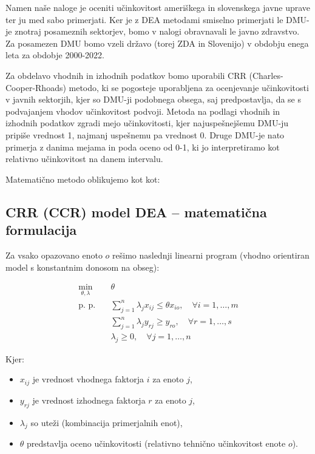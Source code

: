 \documentclass[12pt,a4paper]{article}
\theoremstyle{definition}
\begin{document}
Namen naše naloge je oceniti učinkovitost ameriškega in slovenskega
javne uprave ter ju med sabo primerjati. Ker je z DEA metodami smiselno
primerjati le DMU-je znotraj posameznih sektorjev, bomo v nalogi obravnavali le
javno zdravstvo. Za posamezen DMU bomo vzeli državo (torej ZDA in Slovenijo) v obdobju 
enega leta za obdobje 2000-2022. 

Za obdelavo vhodnih in izhodnih podatkov bomo uporabili CRR 
(Charles-Cooper-Rhoads) metodo, ki se pogosteje uporabljena za 
ocenjevanje učinkovitosti v javnih sektorjih, kjer so DMU-ji podobnega obsega, saj 
predpostavlja, da se s podvajanjem vhodov učinkovitost podvoji. 
Metoda na podlagi vhodnih in izhodnih podatkov zgradi mejo učinkovitosti, kjer najuspešnejšemu DMU-ju pripiše vrednost 1,
najmanj uspešnemu pa vrednost 0. Druge DMU-je nato primerja z danima mejama in poda oceno od 0-1, ki jo
interpretiramo kot relativno učinkovitost na danem intervalu.

Matematično metodo oblikujemo kot kot:

\subsection{CRR (CCR) model DEA – matematična formulacija}

Za vsako opazovano enoto \( o \) rešimo naslednji linearni program (vhodno orientiran model s konstantnim donosom na obseg):

\begin{align*}
\min_{\theta, \lambda} \quad & \theta \\
\text{p. p.} \quad 
& \sum_{j=1}^{n} \lambda_j x_{ij} \leq \theta x_{io}, \quad \forall i = 1, \dots, m \\
& \sum_{j=1}^{n} \lambda_j y_{rj} \geq y_{ro}, \quad \forall r = 1, \dots, s \\
& \lambda_j \geq 0, \quad \forall j = 1, \dots, n
\end{align*}

Kjer:
\begin{itemize}
    \item \( x_{ij} \) je vrednost vhodnega faktorja \( i \) za enoto \( j \),
    \item \( y_{rj} \) je vrednost izhodnega faktorja \( r \) za enoto \( j \),
    \item \( \lambda_j \) so uteži (kombinacija primerjalnih enot),
    \item \( \theta \) predstavlja oceno učinkovitosti (relativno tehnično učinkovitost enote \( o \)).
\end{itemize}
\end{document}
